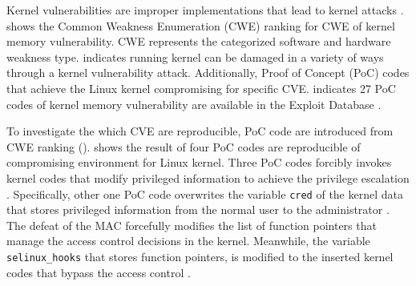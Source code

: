 Kernel vulnerabilities are improper implementations that lead to kernel attacks
\cite{chen11linux}. 
%
 shows the Common Weakness Enumeration
(CWE) ranking for CWE of kernel memory vulnerability. CWE represents the
categorized software and hardware weakness type. 
%
 indicates running kernel can be
damaged in a variety of ways through a kernel vulnerability attack. 
% 
%
Additionally, Proof of Concept (PoC) codes that achieve the Linux kernel
compromising for specific CVE. 
indicates 27 PoC codes of kernel memory vulnerability are available in the
Exploit Database \cite{exploitdb}. 

%

%
To investigate the which CVE are reproducible, PoC code are introduced from CWE
ranking ().
 shows the result of four PoC codes are
reproducible of compromising environment for Linux kernel.
%
Three PoC codes forcibly invokes kernel codes that modify privileged information
to achieve the privilege escalation
\cite{CVE-2016-4997,CVE-2016-9793,CVE-2017-1000112}. 
%
Specifically, other one PoC code overwrites the variable \verb|cred| of the
kernel data that stores privileged information from the normal user to the
administrator \cite{CVE-2017-16995}.
%
The defeat of the MAC forcefully modifies the list of function pointers that
manage the access control decisions in the kernel. Meanwhile, the variable
\verb|selinux_hooks| that stores function pointers, is modified to the inserted
kernel 
codes that bypass the access control \cite{nexus5exploit,grsecurity}.


